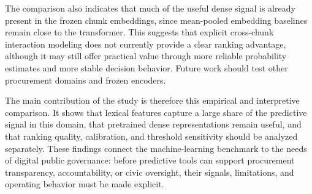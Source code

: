 \documentclass[conference]{IEEEtran}
\begin{document}
The comparison also indicates that much of the useful dense signal is already present in the frozen chunk embeddings, since mean-pooled embedding baselines remain close to the transformer. This suggests that explicit cross-chunk interaction modeling does not currently provide a clear ranking advantage, although it may still offer practical value through more reliable probability estimates and more stable decision behavior. Future work should test other procurement domains and frozen encoders.

The main contribution of the study is therefore this empirical and interpretive comparison. It shows that lexical features capture a large share of the predictive signal in this domain, that pretrained dense representations remain useful, and that ranking quality, calibration, and threshold sensitivity should be analyzed separately. These findings connect the machine-learning benchmark to the needs of digital public governance: before predictive tools can support procurement transparency, accountability, or civic oversight, their signals, limitations, and operating behavior must be made explicit.



\end{document}
